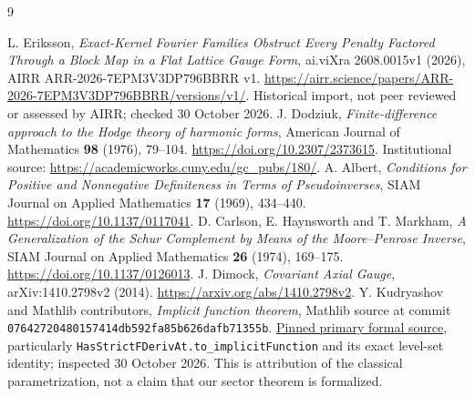 \documentclass[11pt]{article}
\begin{document}
\begin{thebibliography}{9}
\raggedright
{} L. Eriksson, \emph{Exact-Kernel Fourier Families Obstruct
Every Penalty Factored Through a Block Map in a Flat Lattice Gauge Form},
ai.viXra 2608.0015v1 (2026), AIRR ARR-2026-7EPM3V3DP796BBRR v1.
\url{https://airr.science/papers/ARR-2026-7EPM3V3DP796BBRR/versions/v1/}.
Historical import, not peer reviewed or assessed by AIRR; checked 30 October 2026.
 J. Dodziuk, \emph{Finite-difference approach to the Hodge
theory of harmonic forms}, American Journal of Mathematics \textbf{98}
(1976), 79--104. \url{https://doi.org/10.2307/2373615}.
Institutional source: \url{https://academicworks.cuny.edu/gc_pubs/180/}.
 A. Albert, \emph{Conditions for Positive and Nonnegative
Definiteness in Terms of Pseudoinverses}, SIAM Journal on Applied Mathematics
\textbf{17} (1969), 434--440. \url{https://doi.org/10.1137/0117041}.
 D. Carlson, E. Haynsworth and T. Markham,
\emph{A Generalization of the Schur Complement by Means of the Moore--Penrose
Inverse}, SIAM Journal on Applied Mathematics \textbf{26} (1974), 169--175.
\url{https://doi.org/10.1137/0126013}.
 J. Dimock, \emph{Covariant Axial Gauge},
arXiv:1410.2798v2 (2014). \url{https://arxiv.org/abs/1410.2798v2}.
 Y. Kudryashov and Mathlib contributors,
\emph{Implicit function theorem}, Mathlib source at commit
\texttt{07642720480157414db592fa85b626dafb71355b}.
\href{https://github.com/leanprover-community/mathlib4/blob/07642720480157414db592fa85b626dafb71355b/Mathlib/Analysis/Calculus/Implicit.lean}{Pinned primary formal source},
particularly \texttt{HasStrictFDerivAt.to\_implicitFunction} and its exact
level-set identity; inspected 30 October 2026. This is attribution of the
classical parametrization, not a claim that our sector theorem is formalized.
\end{thebibliography}
\end{document}
